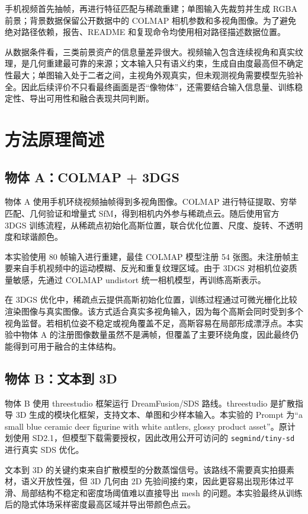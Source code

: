 \documentclass[10pt,twocolumn]{ctexart}
\begin{document}
手机视频首先抽帧，再进行特征匹配与稀疏重建；单图输入先裁剪并生成 RGBA 前景；背景数据保留公开数据中的 COLMAP 相机参数和多视角图像。为了避免绝对路径依赖，报告、README 和复现命令均使用相对路径描述数据位置。

从数据条件看，三类前景资产的信息量差异很大。视频输入包含连续视角和真实纹理，是几何重建最可靠的来源；文本输入只有语义约束，生成自由度最高但不确定性最大；单图输入处于二者之间，主视角外观真实，但未观测视角需要模型先验补全。因此后续评价不只看最终画面是否“像物体”，还需要结合输入信息量、训练稳定性、导出可用性和融合表现共同判断。

\section{方法原理简述}
\subsection{物体 A：COLMAP + 3DGS}
物体 A 使用手机环绕视频抽帧得到多视角图像。COLMAP 进行特征提取、穷举匹配、几何验证和增量式 SfM，得到相机内外参与稀疏点云\cite{schoenberger2016sfm}。随后使用官方 3DGS 训练流程，从稀疏点初始化高斯位置，联合优化位置、尺度、旋转、不透明度和球谐颜色\cite{kerbl2023gaussian}。

本实验使用 80 帧输入进行重建，最佳 COLMAP 模型注册 54 张图。未注册帧主要来自手机视频中的运动模糊、反光和重复纹理区域。由于 3DGS 对相机位姿质量敏感，先通过 COLMAP undistort 统一相机模型，再训练高斯表示。

在 3DGS 优化中，稀疏点云提供高斯初始化位置，训练过程通过可微光栅化比较渲染图像与真实图像。该方式适合真实多视角输入，因为每个高斯会同时受到多个视角监督。若相机位姿不稳定或视角覆盖不足，高斯容易在局部形成漂浮点。本实验中物体 A 的注册图像数量虽然不是满帧，但覆盖了主要环绕角度，因此最终仍能得到可用于融合的主体结构。

\subsection{物体 B：文本到 3D}
物体 B 使用 threestudio 框架运行 DreamFusion/SDS 路线。threestudio 是扩散指导 3D 生成的模块化框架，支持文本、单图和少样本输入\cite{threestudio2023}。本实验的 Prompt 为“a small blue ceramic deer figurine with white antlers, glossy product asset”。原计划使用 SD2.1，但模型下载需要授权，因此改用公开可访问的 \texttt{segmind/tiny-sd} 进行真实 SDS 优化。

文本到 3D 的关键约束来自扩散模型的分数蒸馏信号。该路线不需要真实拍摄素材，语义开放性强，但 3D 几何由 2D 先验间接约束，因此更容易出现形体过平滑、局部结构不稳定和密度场阈值难以直接导出 mesh 的问题。本实验最终从训练后的隐式体场采样密度最高区域并导出带颜色点云。
\end{document}
